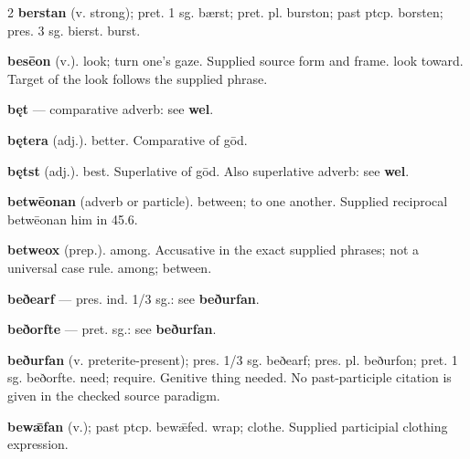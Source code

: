 \begin{multicols*}{2}
\textbf{berstan} (v. strong); pret. 1 sg. bærst; pret. pl. burston; past ptcp. borsten; pres. 3 sg. bierst. burst.\par
\textbf{besēon} (v.). look; turn one's gaze. Supplied source form and frame. look toward. Target of the look follows the supplied phrase.\par
\textbf{bęt} — comparative adverb: see \textbf{wel}.\par
\textbf{bętera} (adj.). better. Comparative of gōd.\par
\textbf{bętst} (adj.). best. Superlative of gōd. Also superlative adverb: see \textbf{wel}.\par
\textbf{betwēonan} (adverb or particle). between; to one another. Supplied reciprocal betwēonan him in 45.6.\par
\textbf{betweox} (prep.). among. Accusative in the exact supplied phrases; not a universal case rule. among; between.\par
\textbf{beðearf} — pres. ind. 1/3 sg.: see \textbf{beðurfan}.\par
\textbf{beðorfte} — pret. sg.: see \textbf{beðurfan}.\par
\textbf{beðurfan} (v. preterite-present); pres. 1/3 sg. beðearf; pres. pl. beðurfon; pret. 1 sg. beðorfte. need; require. Genitive thing needed. No past-participle citation is given in the checked source paradigm.\par
\textbf{bewǣfan} (v.); past ptcp. bewǣfed. wrap; clothe. Supplied participial clothing expression.\par

\end{multicols*}

